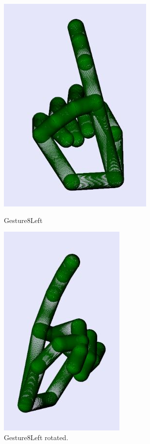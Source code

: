 \begin{figure}[H]
    \centering
    \begin{minipage}{0.5\textwidth}
        \centering
        \includegraphics[scale=.75]{Figures/gesture8Left.JPG} 
        \caption[Gesture8Left]{Gesture8Left}
		\label{fig:Gesture8Left}
    \end{minipage}\hfill
    \begin{minipage}{0.5\textwidth}
        \centering
        \includegraphics[scale=.75]{Figures/gesture8Left_rotated.JPG}
        \caption[Gesture8Left Rotated]{Gesture8Left rotated.}
        \label{fig:Gesture8Left_rotated}
    \end{minipage}
\end{figure}

